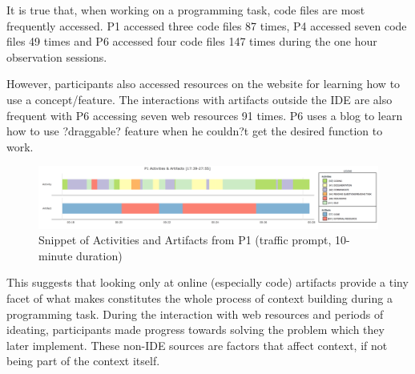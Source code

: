 It is true that, when working on a programming task, code files are most frequently accessed. P1 accessed three code files 87 times, P4 accessed seven code files 49 times and P6 accessed four code files 147 times during the one hour observation sessions.

However, participants also accessed resources on the website for learning how to use a concept/feature. The interactions with artifacts outside the IDE are also frequent with P6 accessing seven web resources 91 times. P6 uses a blog to learn how to use ?draggable? feature when he couldn?t get the desired function to work.


\begin{figure}
\includegraphics[width=\textwidth]{figures/P1timeplot}
\caption{Snippet of Activities and Artifacts from P1 (traffic prompt, 10-minute duration)}
\end{figure}

This suggests that looking only at online (especially code) artifacts provide a tiny facet of what makes constitutes the whole process of context building during a programming task. During the interaction with web resources and periods of ideating, participants made progress towards solving the problem which they later implement. These non-IDE sources are factors that affect context, if not being part of the context itself.

